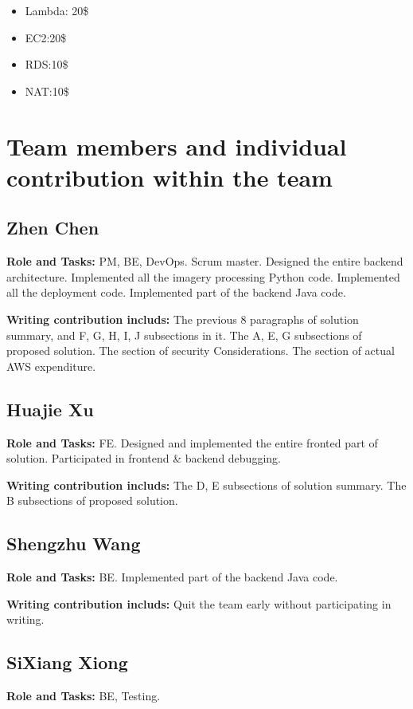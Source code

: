 \documentclass[conference]{IEEEtran}
\begin{document}
\begin{itemize}
    \item Lambda: 20\$
    \item EC2:20\$
    \item RDS:10\$
    \item NAT:10\$
\end{itemize}

\section{Team members and individual contribution within the team}

\subsection{Zhen Chen}
\textbf{Role and Tasks:} PM, BE, DevOps. Scrum master. Designed the entire backend architecture. 
    Implemented all the imagery processing Python code. Implemented all the deployment code. 
    Implemented part of the backend Java code. 

\textbf{Writing contribution includs:} The previous 8 paragraphs of solution summary, and F, G, H, I, J 
    subsections in it. The A, E, G subsections of proposed solution. The section of security 
    Considerations. The section of actual AWS expenditure.

\subsection{Huajie Xu} 
\textbf{Role and Tasks:} FE. Designed and implemented the entire fronted part of solution. Participated in frontend \& backend debugging.

\textbf{Writing contribution includs:} The D, E subsections of solution summary. The B subsections of proposed solution.

\subsection{Shengzhu Wang}
\textbf{Role and Tasks:} BE. Implemented part of the backend Java code. 
 
\textbf{Writing contribution includs:} Quit the team early without participating in writing.

\subsection{SiXiang Xiong}
\textbf{Role and Tasks:} BE, Testing.
\end{document}
